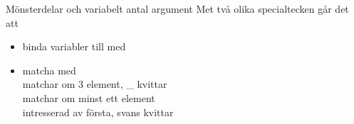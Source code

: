 \begin{Slide}{Mönsterdelar och variabelt antal argument}\SlideFontSmall
Met två olika specialtecken går det att
\begin{itemize}
\item binda variabler till  med  \\

\item matcha   med \code{*}  
\\   matchar om 3 element, \_ kvittar
\\   matchar om minst ett element
\\   intresserad av första, svans kvittar
\end{itemize}
\end{Slide}


